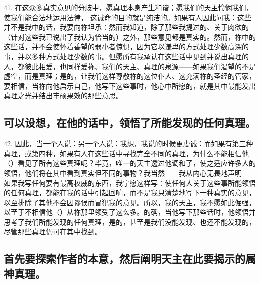 41. 在这众多真实意见的分歧中，愿真理本身产生和谐；愿我们的天主怜悯我们，使我们能合法地运用法律， 这诫命的目的就是纯洁的。如果有人因此问我：这些并不是我中的话，我要向祢坦承：然而我知道，除了那些我提过的、关于肉欲的（针对这些我已说出了我认为恰当的）之外，那些意见都是真实的。然而，祢中的这些话，并不会使怀着善望的弱小者惊惧，因为它以谦卑的方式处理少数高深的事，并以多种方式处理少数的事。但愿所有我承认在这些话中见到并说出真理的人，都彼此相爱，也同样爱祢、我们的天主、真理的泉源——如果我们渴望的不是虚空，而是真理；是的，让我们这样尊敬祢的这位仆人、这充满祢的圣经的管家，要相信，当祢向他启示自己，他写下这些事时，他心中所愿的，就是其中最能发出真理之光并结出丰硕果效的那些意思。\par


\subsection{可以设想，在他的话中，领悟了所能发现的任何真理。}

42. 因此，当一个人说：另一个人说：我想，我说的时候更虔诚：而如果有第三种真理，或第四种，如果有人在这些话中寻找完全不同的真理，为什么不能相信他（）看见了所有这些真理呢？毕竟，唯一的天主透过他调和了，使之适应许多人的领悟，他们将在其中看到真实但不同的事物？我当然——我从内心无畏地声明——如果我写任何要有最高权威的东西，我宁愿这样写：使任何人关于这些事所能领悟的任何真理，都能在我的话中引起回响，而不是我只清楚地写下一种真实的意见，以至排除了其他不会因谬误而冒犯我的意见。所以，我的天主，我不愿如此倔强，以至于不相信他（）从祢那里领受了这么多。的确，当他写下那些话时，他领悟并思考了我们所能发现的任何真理，是的，甚至是我们没能发现、也还不能发现的，尽管那些真理仍可在其中找到。\par


\subsection{首先要探索作者的本意，然后阐明天主在此要揭示的属神真理。}

